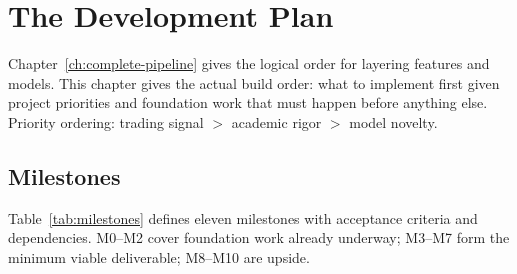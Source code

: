 \chapter{The Development Plan}
\label{ch:development-plan}

Chapter~\ref{ch:complete-pipeline} gives the logical order for layering features and models.
This chapter gives the actual build order: what to implement first given project priorities and foundation work that must happen before anything else.
Priority ordering: trading signal $>$ academic rigor $>$ model novelty.


\section{Milestones}
\label{sec:milestones}

Table~\ref{tab:milestones} defines eleven milestones with acceptance criteria and dependencies.
M0--M2 cover foundation work already underway; M3--M7 form the minimum viable deliverable; M8--M10 are upside.

